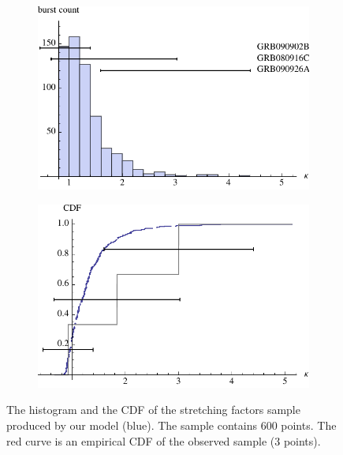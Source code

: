 \documentclass{article}
\begin{document}
\begin{figure}[kappaDistribution]
        \centering
        \begin{subfigure}[kappaDistributionHistogram]{0.49\textwidth}
                \includegraphics[width=\textwidth]{kappaDistributionHistogram}
                \label{fig:kappaDistributionHistogram}
        \end{subfigure}
        \begin{subfigure}[kappaDistributionCDF]{0.49\textwidth}
                \includegraphics[width=\textwidth]{kappaDistributionCDF}
                \label{fig:kappaDistributionCDF}
        \end{subfigure}
        \caption{The histogram and the CDF of the stretching factors sample produced by our model (blue). The sample contains $600$ points. The red curve is an empirical CDF of the observed sample (3 points).}
        \label{fig:kappaDistribution}
\end{figure}
\end{document}
